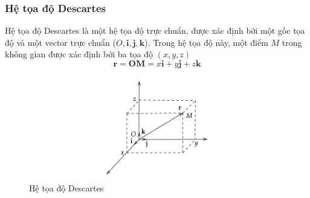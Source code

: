 \subsubsection{Hệ tọa độ Descartes}
\begin{definition}
    Hệ tọa độ Descartes là một hệ tọa độ trực chuẩn, được xác định bởi một gốc tọa độ và một vector trực chuẩn (\(O, \mathbf{i}, \mathbf{j}, \mathbf{k}\)). Trong hệ tọa độ này, một điểm \(M\) trong không gian được xác định bởi ba tọa độ \((x, y, z)\)
    \begin{equation}
        \mathbf{r}=\mathbf{OM} = x\mathbf{i} + y\mathbf{j} + z\mathbf{k}
    \end{equation}
\end{definition}
\begin{figure}[H]
    \centering
    \includegraphics[width=1\textwidth]{Tuan2/Figures/toadodescartes.png}
    \caption{Hệ tọa độ Descartes}
\end{figure}